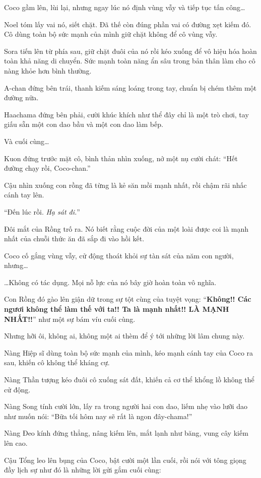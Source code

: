 \documentclass[../main.tex]{subfiles}
\begin{document}
Coco gầm lên, lùi lại, nhưng ngay lúc nó định vùng vẫy và tiếp tục tấn công\dots

Noel tóm lấy vai nó, siết chặt. Đã thế còn đúng phần vai có đường xẹt kiếm đó. Cô dùng toàn bộ sức mạnh của mình giữ chặt không để cô vùng vẫy.

Sora tiến lên từ phía sau, giữ chặt đuôi của nó rồi kéo xuống để vô hiệu hóa hoàn toàn khả năng di chuyển. Sức mạnh toàn năng ẩn sâu trong bản thân làm cho cô nàng khỏe hơn bình thường.

A-chan đứng bên trái, thanh kiếm sáng loáng trong tay, chuẩn bị chém thêm một đường nữa.

Haachama đứng bên phải, cười khúc khích như thể đây chỉ là một trò chơi, tay giấu sẵn một con dao bầu và một con dao làm bếp.

Và cuối cùng\dots

Kuon đứng trước mặt cô, bình thản nhìn xuống, nở một nụ cười chát: ``Hết đường chạy rồi, Coco-chan.''

Cậu nhìn xuống con rồng đã từng là kẻ săn mồi mạnh nhất, rồi chậm rãi nhấc cánh tay lên.

``Đến lúc rồi. \emph{Hạ sát đi.}''

Đôi mắt của Rồng trố ra. Nó biết rằng cuộc đời của một loài được coi là mạnh nhất của chuỗi thức ăn đã sắp đi vào hồi kết.

Coco cố gắng vùng vẫy, cử động thoát khỏi sự tàn sát của năm con người, nhưng\dots

\dots Không có tác dụng. Mọi nỗ lực của nó bây giờ hoàn toàn vô nghĩa.

Con Rồng đó gào lên giận dữ trong sự tột cùng của tuyệt vọng: ``\textbf{Không!! Các ngươi không thể làm thế với ta!! Ta là mạnh nhất!! LÀ MẠNH NHẤT!!}'' như một sự bám víu cuối cùng.

Nhưng hỡi ôi, không ai, không một ai thèm để ý tới những lời lâm chung này.

Nàng Hiệp sĩ dùng toàn bộ sức mạnh của mình, kéo mạnh cánh tay của Coco ra sau, khiến cô không thể kháng cự.

Nàng Thần tượng kéo đuôi cô xuống sát đất, khiến cả cơ thể khổng lồ không thể cử động.

Nàng Song tính cười lớn, lấy ra trong người hai con dao, liếm nhẹ vào lưỡi dao như muốn nói: ``Bữa tối hôm nay sẽ rất là ngon đây-chama!''

Nàng Đeo kính đứng thẳng, nâng kiếm lên, mắt lạnh như băng, vung cây kiếm lên cao.

Cậu Tổng leo lên bụng của Coco, bật cười một lần cuối, rồi nói với tông giọng đầy lịch sự như đó là những lời gửi gắm cuối cùng:
\end{document}
